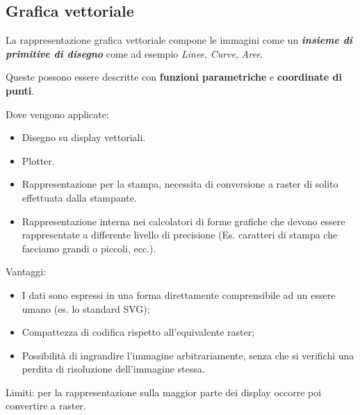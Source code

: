 \documentclass[a4paper, 10pt]{article}
\begin{document}
	\subsection{Grafica vettoriale}
		La rappresentazione grafica vettoriale compone le immagini come un \textit{\textbf{insieme di primitive di disegno}} come ad esempio \textit{Linee}, \textit{Curve}, \textit{Aree}.
		
		\noindent
		Queste possono essere descritte con \textbf{funzioni parametriche} e \textbf{coordinate di punti}.
		
		\noindent
		Dove vengono applicate:
		\begin{itemize}
			\item Disegno su display vettoriali.
			\item Plotter.
			\item Rappresentazione per la stampa, necessita di conversione a raster di
			solito effettuata dalla stampante.
			\item Rappresentazione interna nei calcolatori di forme grafiche che
			devono essere rappresentate a differente livello di precisione (Es. caratteri di stampa che facciamo grandi o piccoli, ecc.).
		\end{itemize}
		
		\noindent
		Vantaggi:
		\begin{itemize}
			\item I dati sono espressi in una forma direttamente comprensibile ad un
			essere umano (es. lo standard SVG);
			\item Compattezza di codifica rispetto all'equivalente raster;
			\item Possibilità di ingrandire l'immagine arbitrariamente, senza che si
			verifichi una perdita di risoluzione dell'immagine stessa.
		\end{itemize}
		Limiti: per la rappresentazione sulla maggior parte dei display occorre poi
		convertire a raster.
		
\end{document}
